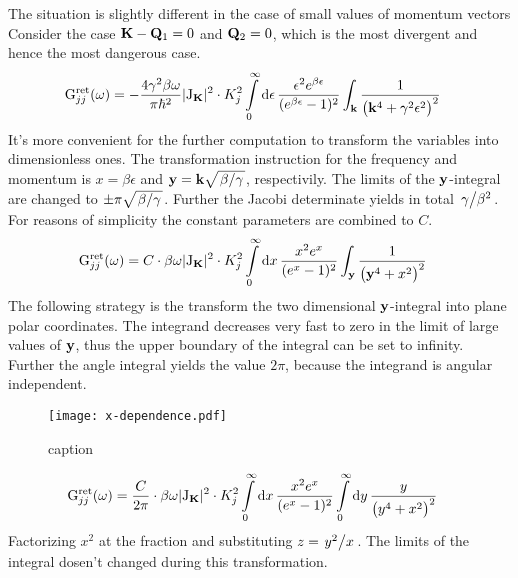 The situation is slightly different in the case of small values of momentum vectors
Consider the case $\vb{K} - \vb{Q}_{1} = 0$ and $\vb{Q}_{2} = 0$, which is the most divergent and hence the most dangerous case.
%
\begin{align}
	\mathrm{G}_{jj}^{\mathrm{ret}}(\omega) &= 
		-\frac{4 \gamma^{2} \beta \omega}{\pi \hbar^{2}}
		\vert \mathrm{J}_{\vb{K}} \vert^{2} \cdot K_{j}^{2}
		\int\limits_{0}^{\infty} \dd{\epsilon}
		\frac{\epsilon^{2} e^{\beta \epsilon}}{(e^{\beta \epsilon} - 1)^{2}}
		\int_{\vb{k}}
		\frac{1}{\big(\vb{k}^{4} + \gamma^{2} \epsilon^{2}\big)^{2}}
	\label{eq: Green function most divergent case}
\end{align}
%
It's more convenient for the further computation to transform the variables into dimensionless ones.
The transformation instruction for the frequency and momentum is $x = \beta \epsilon$ and $\vb{y} = \vb{k}\sqrt{\flatfrac{\beta}{\gamma}}$, respectivily.
The limits of the $\vb{y}$-integral are changed to $\pm \pi\sqrt{\flatfrac{\beta}{\gamma}}$.
Further the Jacobi determinate yields in total $\flatfrac{\gamma}{\beta^{2}}$.
For reasons of simplicity the constant parameters are combined to $C$.
%
\begin{align}
	\mathrm{G}_{jj}^{\mathrm{ret}}(\omega) &= 
		C \cdot \beta \omega
		\vert \mathrm{J}_{\vb{K}} \vert^{2} \cdot K_{j}^{2}
		\int\limits_{0}^{\infty} \dd{x}
		\frac{x^{2} e^{x}}{(e^{x} - 1)^{2}}
		\int_{\vb{y}}
		\frac{1}{\big(\vb{y}^{4} + x^{2}\big)^{2}}
\end{align}
%
The following strategy is the transform the two dimensional $\vb{y}$-integral into plane polar coordinates.
The integrand decreases very fast to zero in the limit of large values of $\vb{y}$, thus the upper boundary of the integral can be set to infinity. 
Further the angle integral yields the value $2\pi$, because the integrand is angular independent.
%
\begin{figure}[t]
	\centering
	\texttt{[image: x-dependence.pdf]}
	\caption{caption}
	\label{fig: x-dependence}
\end{figure}
%
%
\begin{align}
	\mathrm{G}_{jj}^{\mathrm{ret}}(\omega) &= 
		\frac{C}{2\pi} \cdot \beta \omega
		\vert \mathrm{J}_{\vb{K}} \vert^{2} \cdot K_{j}^{2}
		\int\limits_{0}^{\infty} \dd{x}
		\frac{x^{2} e^{x}}{(e^{x} - 1)^{2}}
		\int\limits_{0}^{\infty} \dd{y}
		\frac{y}{\big(y^{4} + x^{2}\big)^{2}}
\end{align}
%
Factorizing $x^{2}$ at the fraction and substituting $z = \flatfrac{y^{2}}{x}$.
The limits of the integral dosen't changed during this transformation.

